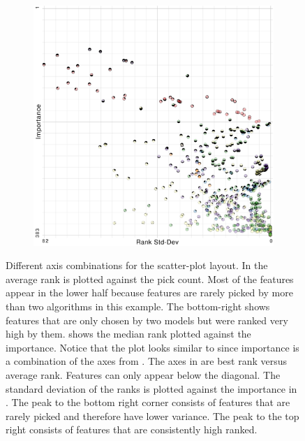 \begin{figure}[ht]
\begin{subfigure}{0.24\linewidth}
\label{subfig:ba}
\end{subfigure}%
~%
\begin{subfigure}{0.24\linewidth}
\includegraphics[width=\linewidth]{infuse/si}
\label{subfig:si}
\end{subfigure}
\caption{
Different axis combinations for the scatter-plot layout.
In  the average rank is plotted against the pick count.
Most of the features appear in the lower half because features are rarely picked by more than two algorithms in this example.  The bottom-right shows features that are only chosen
by two models but were ranked very high by them.
 shows the median rank plotted against the importance.
Notice that the plot looks similar to  since importance
is a combination of the axes from .
The axes in  are best rank versus average rank.
Features can only appear below the diagonal.
The standard deviation of the ranks is plotted against the importance
in .
The peak to the bottom right corner consists of features that are rarely
picked and therefore have lower variance.
The peak to the top right consists of features that
are consistently high ranked.
}
\label{fig:scatter}
\end{figure}

